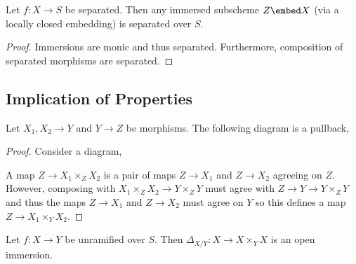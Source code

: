\documentclass[12pt]{article}
\begin{document}
\begin{prop}
Let $f : X \to S$ be separated. Then any immersed subscheme $Z \embed X$ (via a locally closed embedding) is separated over $S$.
\end{prop}

\begin{proof}
Immersions are monic and thus separated. Furthermore, composition of separated morphisms are separated. 
\end{proof}

\subsection{Implication of Properties}

\begin{lemma}
Let $X_1, X_2 \to Y$ and $Y \to Z$ be morphisms. The following diagram is a pullback,
\begin{center}
\end{center}
\end{lemma}

\begin{proof}
Consider a diagram,
\begin{center}
\end{center}
A map $Z \to X_1 \times_Z X_2$ is a pair of maps $Z \to X_1$ and $Z \to X_2$ agreeing on $Z$. However, composing with $X_1 \times_Z X_2 \to Y \times_Z Y$ must agree with $Z \to Y \to Y \times_Z Y$ and thus the maps $Z \to X_1$ and $Z \to X_2$ must agree on $Y$ so this defines a map $Z \to X_1 \times_Y X_2$. 
\end{proof}

\begin{lemma}
Let $f : X \to Y$ be unramified over $S$. Then $\Delta_{X/Y} : X \to X \times_Y X$ is an open immersion.
\end{lemma}
\end{document}
